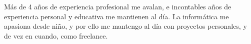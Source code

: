

\begin{cvparagraph}

Más de 4 años de experiencia profesional me avalan, e incontables años de experiencia personal y educativa me mantienen al día.
La informática me apasiona desde niño, y por ello me mantengo al día con proyectos personales, y de vez en cuando, como freelance. 

\end{cvparagraph}
